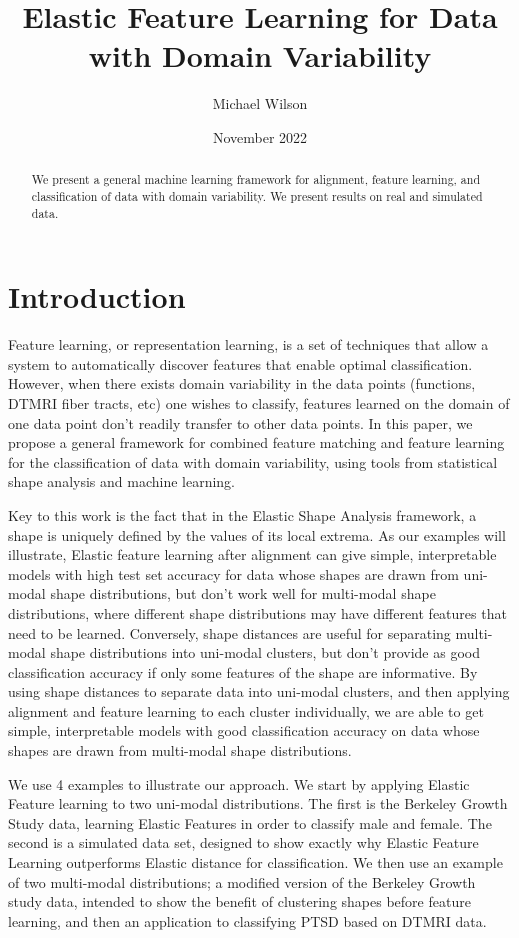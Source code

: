 \documentclass[]{article}
\title{Elastic Feature Learning for Data with Domain Variability}
\author{Michael Wilson}
\date{November 2022}
\begin{document}
\maketitle

\begin{abstract}
We present a general machine learning framework for alignment, feature learning, and classification of data with domain variability. We present results on real and simulated data.  
\end{abstract}

\section{Introduction}

Feature learning, or representation learning, is a set of techniques that allow a system to automatically discover features that enable optimal classification. However, when there exists domain variability in the data points (functions, DTMRI fiber tracts, etc) one wishes to classify, features learned on the domain of one data point don't readily transfer to other data points. In this paper, we propose a general framework for combined feature matching and feature learning for the classification of data with domain variability, using tools from statistical shape analysis and machine learning. 

Key to this work is the fact that in the Elastic Shape Analysis framework, a shape is uniquely defined by the values of its local extrema. As our examples will illustrate, Elastic feature learning after alignment can give simple, interpretable models with high test set accuracy for data whose shapes are drawn from uni-modal shape distributions, but don't work well for multi-modal shape distributions, where different shape distributions may have different features that need to be learned. Conversely, shape distances are useful for separating multi-modal shape distributions into uni-modal clusters, but don't provide as good classification accuracy if only some features of the shape are informative. By using shape distances to separate data into uni-modal clusters, and then applying alignment and feature learning to each cluster individually, we are able to get simple, interpretable models with good classification accuracy on data whose shapes are drawn from multi-modal shape distributions. 

We use 4 examples to illustrate our approach. We start by applying Elastic Feature learning to two uni-modal distributions. The first is the Berkeley Growth Study data, learning Elastic Features in order to classify male and female. The second is a simulated data set, designed to show exactly why Elastic Feature Learning outperforms Elastic distance for classification. We then use an example of two multi-modal distributions; a modified version of the Berkeley Growth study data, intended to show the benefit of clustering shapes before feature learning, and then an application to classifying PTSD based on DTMRI data.
\end{document}
